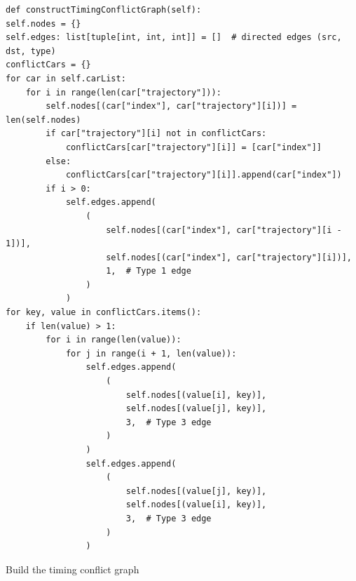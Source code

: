 \documentclass{article}
\begin{document}
\begin{listing}[H]
    \begin{verbatim}
def constructTimingConflictGraph(self):
self.nodes = {}
self.edges: list[tuple[int, int, int]] = []  # directed edges (src, dst, type)
conflictCars = {}
for car in self.carList:
    for i in range(len(car["trajectory"])):
        self.nodes[(car["index"], car["trajectory"][i])] = len(self.nodes)
        if car["trajectory"][i] not in conflictCars:
            conflictCars[car["trajectory"][i]] = [car["index"]]
        else:
            conflictCars[car["trajectory"][i]].append(car["index"])
        if i > 0:
            self.edges.append(
                (
                    self.nodes[(car["index"], car["trajectory"][i - 1])],
                    self.nodes[(car["index"], car["trajectory"][i])],
                    1,  # Type 1 edge
                )
            )
for key, value in conflictCars.items():
    if len(value) > 1:
        for i in range(len(value)):
            for j in range(i + 1, len(value)):
                self.edges.append(
                    (
                        self.nodes[(value[i], key)],
                        self.nodes[(value[j], key)],
                        3,  # Type 3 edge
                    )
                )
                self.edges.append(
                    (
                        self.nodes[(value[j], key)],
                        self.nodes[(value[i], key)],
                        3,  # Type 3 edge
                    )
                )
    \end{verbatim}
    \caption{Build the timing conflict graph}
    \label{lst:build-timing-conflict-graph}
\end{listing}
\end{document}
